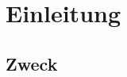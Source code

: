 \documentclass[11pt,a4paper]{article}
\begin{document}
%
%
%


\section{Einleitung}%



 	\subsection{Zweck} %
	
\end{document}
